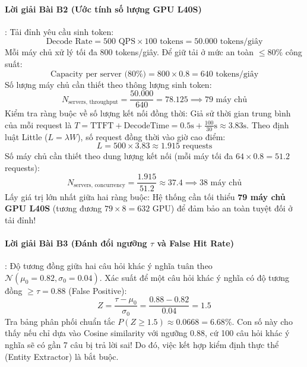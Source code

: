 \paragraph{Lời giải Bài B2 (Ước tính số lượng GPU L40S)}:
Tải đỉnh yêu cầu sinh token:
\begin{equation*}
\text{Decode Rate} = 500 \text{ QPS} \times 100 \text{ tokens} = 50.000 \text{ tokens/giây}
\end{equation*}
Mỗi máy chủ xử lý tối đa 800 tokens/giây. Để giữ tải ở mức an toàn $\le 80\%$ công suất:
\begin{equation*}
\text{Capacity per server (80\%)} = 800 \times 0.8 = 640 \text{ tokens/giây}
\end{equation*}
Số lượng máy chủ cần thiết theo thông lượng sinh token:
\begin{equation*}
N_{\text{servers, throughput}} = \frac{50.000}{640} = 78.125 \implies 79 \text{ máy chủ}
\end{equation*}
Kiểm tra ràng buộc về số lượng kết nối đồng thời:
Giả sử thời gian trung bình của mỗi request là $T = \text{TTFT} + \text{DecodeTime} = 0.5\text{s} + \frac{100}{30}\text{s} \approx 3.83\text{s}$.
Theo định luật Little ($L = \lambda W$), số request đồng thời vào giờ cao điểm:
\begin{equation*}
L = 500 \times 3.83 \approx 1.915 \text{ requests}
\end{equation*}
Số máy chủ cần thiết theo dung lượng kết nối (mỗi máy tối đa $64 \times 0.8 = 51.2$ requests):
\begin{equation*}
N_{\text{servers, concurrency}} = \frac{1.915}{51.2} \approx 37.4 \implies 38 \text{ máy chủ}
\end{equation*}
Lấy giá trị lớn nhất giữa hai ràng buộc: Hệ thống cần tối thiểu \textbf{79 máy chủ GPU L40S} (tương đương $79 \times 8 = 632$ GPU) để đảm bảo an toàn tuyệt đối ở tải đỉnh!

\paragraph{Lời giải Bài B3 (Đánh đổi ngưỡng $\tau$ và False Hit Rate)}:
Độ tương đồng giữa hai câu hỏi khác ý nghĩa tuân theo $\mathcal{N}(\mu_0 = 0.82, \sigma_0 = 0.04)$.
Xác suất để một câu hỏi khác ý nghĩa có độ tương đồng $\ge \tau = 0.88$ (False Positive):
\begin{equation*}
Z = \frac{\tau - \mu_0}{\sigma_0} = \frac{0.88 - 0.82}{0.04} = 1.5
\end{equation*}
Tra bảng phân phối chuẩn tắc $P(Z \ge 1.5) \approx 0.0668 = 6.68\%$.
Con số này cho thấy nếu chỉ dựa vào Cosine similarity với ngưỡng $0.88$, cứ 100 câu hỏi khác ý nghĩa sẽ có gần 7 câu bị trả lời sai! Do đó, việc kết hợp kiểm định thực thể (Entity Extractor) là bắt buộc.

